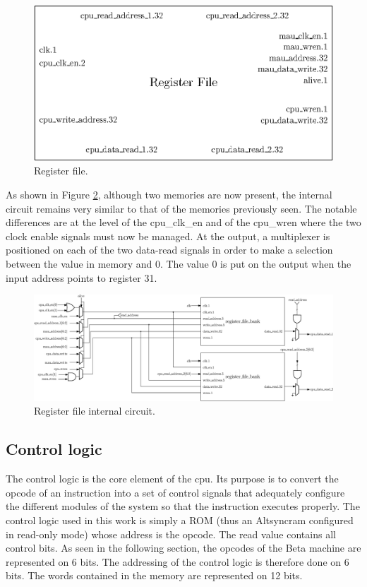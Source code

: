 \begin{figure}[H]
    \centering
    \includegraphics[scale=0.6]{Chapter3-CPU/res/reg_file}
    \caption{Register file.}
    \label{fig:components/rf}
\end{figure}

As shown in Figure \ref{fig:components/rf_in}, although two memories are now present, the internal 
circuit remains very similar to that of the memories previously seen. The notable differences are at 
the level of the cpu\_clk\_en and of the cpu\_wren where the two clock enable signals 
must now be managed. At the output, a multiplexer is positioned on each of the two data-read signals in 
order to make a selection between the value in memory and 0. The value 0 is put on the output when 
the input address points to register 31.

\begin{figure}[H]
    \centering
    \includegraphics[width=\linewidth]{Chapter3-CPU/res/reg_file_in}
    \caption{Register file internal circuit.}
    \label{fig:components/rf_in}
\end{figure}

\subsection{Control logic}

The control logic is the core element of the cpu. Its purpose is to convert the opcode of an 
instruction into a set of control signals that adequately configure the different modules of 
the system so that the instruction executes properly. The control logic used in this work is simply a 
ROM (thus an Altsyncram configured in read-only mode) whose address is the opcode. The read value 
contains all control bits. As seen in the following section, the opcodes of the Beta 
machine are represented on 6 bits. The addressing of the control logic is therefore done on 6 bits. 
The words contained in the memory are represented on 12 bits.

